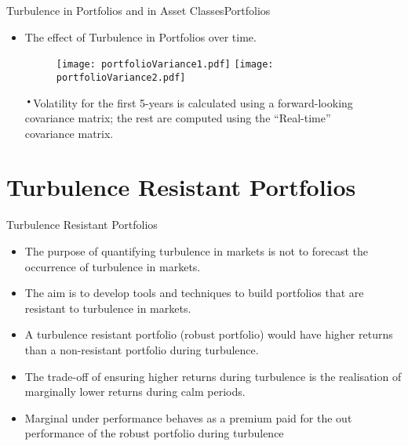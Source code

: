 \documentclass{beamer}
\newcommand*{\LargerCdot}{\raisebox{-0.25ex}{\scalebox{2.3}{$\cdot$}}}
\begin{document}
\begin{frame}{Turbulence in Portfolios and in Asset Classes}{Portfolios}
	\begin{itemize}
		\vspace*{-0in}
		\item{The effect of Turbulence in Portfolios over time.}
		\begin{figure}
			\begin{itemize}
				\begin{center}
					\vspace*{0.1in}
					\hspace*{-0.8in}
	                  \texttt{[image: portfolioVariance1.pdf]} \hspace{0.02in}
                       \texttt{[image: portfolioVariance2.pdf]} 
				\end{center}
			\end{itemize}
		\end{figure}
		\hspace*{-0.5in}
		\parbox{5in}{$\LargerCdot$Volatility for the first 5-years is calculated using a forward-looking\\ covariance matrix; the rest are computed using the ``Real-time''\\ covariance matrix.}\newline
	\end{itemize}
\end{frame}

\section{Turbulence Resistant Portfolios}
\begin{frame}{Turbulence Resistant Portfolios}{}
	\begin{itemize}
		\item{The purpose of quantifying turbulence in markets is \alert{not} to forecast the occurrence of turbulence in markets.}\newline
		\item{The aim is to develop tools and techniques to build portfolios that are resistant to turbulence in markets.}\newline  
		\item{A turbulence resistant portfolio (\alert{robust portfolio}) would have higher returns than a non-resistant portfolio during turbulence.}\newline
		\item{The trade-off of ensuring higher returns during turbulence is the realisation of marginally lower returns during calm 							periods.}\newline
		\item{Marginal under performance behaves as a \alert{premium} paid for the out 				performance of the robust portfolio during turbulence}
	\end{itemize}
\end{frame}
\end{document}
